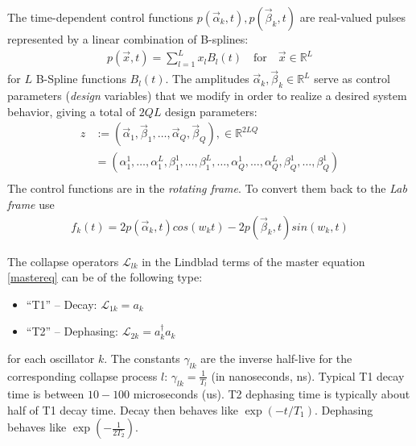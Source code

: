 \documentclass[letterpaper]{article}
\newcommand{\Ell}{\mathcal{L}}
\newcommand{\R}{\mathds{R}}
\begin{document}
The time-dependent control functions $p(\vec{\alpha}_k,t), p(\vec{\beta}_k,t)$ are real-valued pulses represented by a linear combination of B-splines: 
\begin{align*}
  p(\vec{x},t) = \sum_{l=1}^L x_l B_l(t) \quad \text{for} \quad \vec x \in \R^L
\end{align*}
for $L$ B-Spline functions $B_l(t)$. The amplitudes $\vec{\alpha}_k, \vec{\beta}_k \in \R^{L}$ serve as control parameters (\textit{design} variables) that we modify in order to realize a desired system behavior, giving a total of $2QL$ design parameters:
\begin{align*}
  z &:= \left( \vec{\alpha}_1, \vec{\beta}_1, \dots, \vec{\alpha}_Q, \vec{\beta}_Q \right), \in \mathds{R}^{2LQ} \\
    &=\left(\alpha_1^1,\dots,\alpha_1^L,\beta_1^1, \dots, \beta_1^L, \dots, \alpha_Q^1,\dots,\alpha_Q^L,\beta_Q^1, \dots, \beta_Q^1 \right) \\
\end{align*}
The control functions are in the \textit{rotating frame}. To convert them back to the \textit{Lab frame} use
\begin{align}
  f_k(t) = 2p(\vec{\alpha}_k, t) cos(w_k t) - 2 p(\vec{\beta}_k,t) sin(w_k,t)
\end{align}

The collapse operators $\Ell_{lk}$ in the Lindblad terms of the master equation \eqref{mastereq} can be of the following type:
\begin{itemize}
  \item ``T1'' -- Decay: $\Ell_{1k} = a_k$
  \item ``T2'' -- Dephasing: $\Ell_{2k} = a_k^{\dagger}a_k$
\end{itemize}
for each oscillator $k$. The constants $\gamma_{lk}$ are the inverse half-live for the corresponding collapse process $l$: $\gamma_{lk} = {\frac{1}{T_l}}$ (in nanoseconds, ns). Typical T1 decay time is between $10-100$ microseconds (us). T2 dephasing time is typically about half of T1 decay time. Decay then behaves like $\exp(-t/{T_1})$. Dephasing behaves like $\exp(-\frac{1}{2{T_2}})$.
\end{document}

